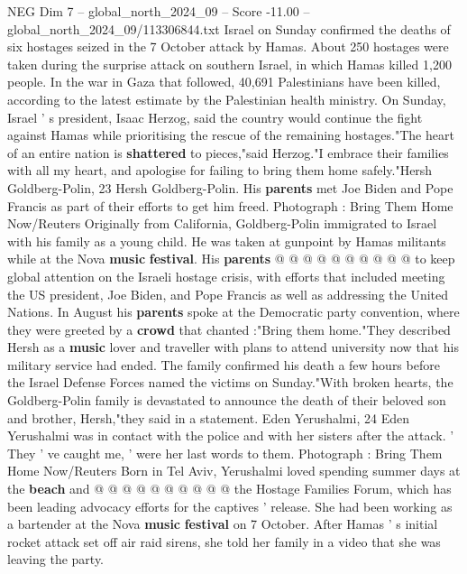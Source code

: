 \begin{textsample}{NEG Dim 7 – global\_north\_2024\_09 – Score -11.00 – global\_north\_2024\_09/113306844.txt}  \label{ex:f7_neg_011}
Israel on Sunday confirmed the deaths of six hostages seized in the 7 October attack by Hamas.
About 250 hostages were taken during the surprise attack on southern Israel, in which Hamas killed 1,200 people.
In the war in Gaza that followed, 40,691 Palestinians have been killed, according to the latest estimate by the Palestinian health ministry.
On Sunday, Israel ' s president, Isaac Herzog, said the country would continue the fight against Hamas while prioritising the rescue of the remaining hostages."The heart of an entire nation is \textbf{shattered} to pieces,"said Herzog."I embrace their families with all my heart, and apologise for failing to bring them home safely."Hersh Goldberg-Polin, 23 Hersh Goldberg-Polin.
His \textbf{parents} met Joe Biden and Pope Francis as part of their efforts to get him freed.
Photograph : Bring Them Home Now/Reuters Originally from California, Goldberg-Polin immigrated to Israel with his family as a young child.
He was taken at gunpoint by Hamas militants while at the Nova \textbf{music} \textbf{festival}.
His \textbf{parents} @ @ @ @ @ @ @ @ @ @ to keep global attention on the Israeli hostage crisis, with efforts that included meeting the US president, Joe Biden, and Pope Francis as well as addressing the United Nations.
In August his \textbf{parents} spoke at the Democratic party convention, where they were greeted by a \textbf{crowd} that chanted :"Bring them home."They described Hersh as a \textbf{music} lover and traveller with plans to attend university now that his military service had ended.
The family confirmed his death a few hours before the Israel Defense Forces named the victims on Sunday."With broken hearts, the Goldberg-Polin family is devastated to announce the death of their beloved son and brother, Hersh,"they said in a statement.
Eden Yerushalmi, 24 Eden Yerushalmi was in contact with the police and with her sisters after the attack. ' They ' ve caught me, ' were her last words to them.
Photograph : Bring Them Home Now/Reuters Born in Tel Aviv, Yerushalmi loved spending summer days at the \textbf{beach} and @ @ @ @ @ @ @ @ @ @ the Hostage Families Forum, which has been leading advocacy efforts for the captives ' release.
She had been working as a bartender at the Nova \textbf{music} \textbf{festival} on 7 October.
After Hamas ' s initial rocket attack set off air raid sirens, she told her family in a video that she was leaving the party.

\end{textsample}
